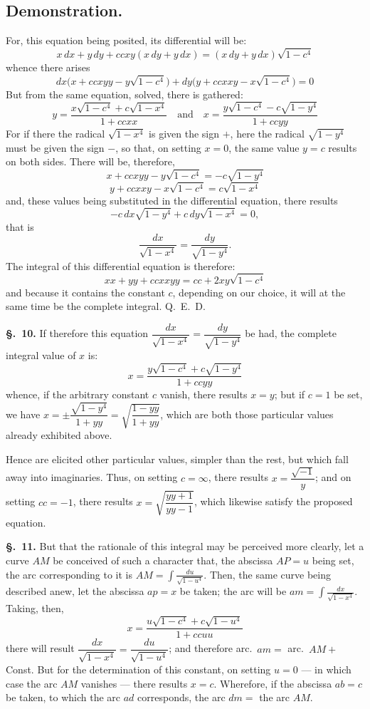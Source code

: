 \documentclass{article}
\begin{document}
\subsection*{Demonstration.}
For, this equation being posited, its differential will be:
\[ x\,dx + y\,dy + ccxy(x\,dy + y\,dx) = (x\,dy + y\,dx)\sqrt{1-c^{4}} \]
whence there arises
\[ dx\bigl(x + ccxyy - y\sqrt{1-c^{4}}\bigr) + dy\bigl(y + ccxxy - x\sqrt{1-c^{4}}\bigr) = 0 \]
But from the same equation, solved, there is gathered:
\[ y = \frac{x\sqrt{1-c^{4}} + c\sqrt{1-x^{4}}}{1+ccxx} \quad\text{and}\quad
   x = \frac{y\sqrt{1-c^{4}} - c\sqrt{1-y^{4}}}{1+ccyy} \]
For if there the radical $\sqrt{1-x^{4}}$ is given the sign $+$, here the radical $\sqrt{1-y^{4}}$
must be given the sign $-$, so that, on setting $x = 0$, the same value $y = c$ results on both
sides. There will be, therefore,
\[ x + ccxyy - y\sqrt{1-c^{4}} = -c\sqrt{1-y^{4}} \]
\[ y + ccxxy - x\sqrt{1-c^{4}} = c\sqrt{1-x^{4}} \]
and, these values being substituted in the differential equation, there results
\[ -c\,dx\sqrt{1-y^{4}} + c\,dy\sqrt{1-x^{4}} = 0, \]
that is
\[ \frac{dx}{\sqrt{1-x^{4}}} = \frac{dy}{\sqrt{1-y^{4}}}. \]
The integral of this differential equation is therefore:
\[ xx + yy + ccxxyy = cc + 2xy\sqrt{1-c^{4}} \]
and because it contains the constant $c$, depending on our choice, it will at the same time be the
complete integral. Q.~E.~D.

\textbf{§.~10.} If therefore this equation
$\dfrac{dx}{\sqrt{1-x^{4}}} = \dfrac{dy}{\sqrt{1-y^{4}}}$ be had, the complete integral value of $x$
is:
\[ x = \frac{y\sqrt{1-c^{4}} + c\sqrt{1-y^{4}}}{1+ccyy} \]
whence, if the arbitrary constant $c$ vanish, there results $x = y$; but if $c = 1$ be set, we have
$x = \pm\dfrac{\sqrt{1-y^{4}}}{1+yy} = \sqrt{\dfrac{1-yy}{1+yy}}$, which are both those particular
values already exhibited above.

Hence are elicited other particular values, simpler than the rest, but which fall away into
imaginaries. Thus, on setting $c = \infty$, there results $x = \dfrac{\sqrt{-1}}{y}$; and on setting
$cc = -1$, there results
$x = \sqrt{\dfrac{yy+1}{yy-1}}$, which likewise satisfy the proposed equation.

\textbf{§.~11.} But that the rationale of this integral may be perceived more clearly, let a curve
$AM$ be conceived of such a character that, the abscissa $AP = u$ being set, the arc corresponding to
it is $AM = \displaystyle\int \frac{du}{\sqrt{1-u^{4}}}$.
Then, the same curve being described anew, let the abscissa
$ap = x$ be taken; the arc will be $am = \displaystyle\int \frac{dx}{\sqrt{1-x^{4}}}$. Taking, then,
\[ x = \frac{u\sqrt{1-c^{4}} + c\sqrt{1-u^{4}}}{1+ccuu} \]
there will result $\dfrac{dx}{\sqrt{1-x^{4}}} = \dfrac{du}{\sqrt{1-u^{4}}}$; and therefore
arc.~$am = $ arc.~$AM + $
Const. But for the determination of this constant, on setting $u = 0$ — in which case the arc $AM$
vanishes — there results $x = c$. Wherefore, if the abscissa $ab = c$ be taken, to which the arc $ad$
corresponds, the arc $dm = $ the arc $AM$.
\end{document}
